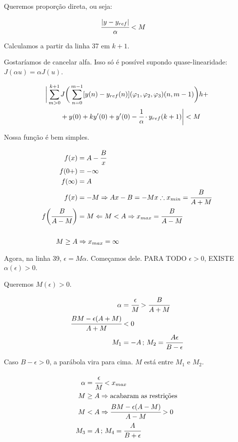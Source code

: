 \documentclass[12pt]{article}
\begin{document}
Queremos propor\c{c}\~ao direta, ou seja:

\begin{align}
  \cfrac{|y - y_{ref}|}{\alpha} &< M
\end{align}

Calculamos a partir da linha 37 em $k + 1$.

Gostar\'iamos de cancelar alfa. Isso s\'o \'e poss\'ivel supondo quase-linearidade: $J(\alpha u) = \alpha J(u)$.

\begin{align}
 \bigg|\sum_{m > 0}^{k+1} &J\bigg( \sum_{n = 0}^{m - 1} [y(n) - y_{ref}(n)] (\varphi_1, \varphi_2, \varphi_3) (n, m-1) \bigg) h + \nonumber \\
&+ y(0) + k y'(0) + y'(0) - \cfrac{1}{\alpha}\cdot y_{ref}(k + 1)\bigg| < M
\end{align}

Nossa fun\c{c}\~ao \'e bem simples.

\begin{align}
 f(x) &= A - \cfrac{B}{x} \\
 f(0+) &= - \infty \\
 f(\infty) &= A \\
 f(x) &= - M \Rightarrow Ax - B = - Mx \therefore x_{min} = \cfrac{B}{A + M} \\
 f\bigg(\cfrac{B}{A - M}\bigg) &= M \Leftarrow M < A \Rightarrow x_{max} = \cfrac{B}{A - M} \\
 \\
 M \ge A &\Rightarrow x_{max} = \infty
\end{align}

Agora, na linha 39, $\epsilon = M\alpha $. Come\c{c}amos dele. PARA TODO $\epsilon > 0$, EXISTE $\alpha(\epsilon) > 0$.

Queremos $M(\epsilon) > 0$.

\begin{align}
 \alpha &= \cfrac{\epsilon}{M} > \cfrac{B}{A + M} \\
 \cfrac{BM - \epsilon(A+M)}{A+M} &< 0 \\
 M_1 &= - A \,;\, M_2 = \cfrac{A \epsilon}{B - \epsilon}
\end{align}

Caso $B - \epsilon > 0$, a par\'abola vira para cima. $M$ est\'a entre $M_1$ e $M_2$.

\begin{align}
 \alpha &= \cfrac{\epsilon}{M} < x_{max} \\
 M &\ge A \Rightarrow \text{acabaram as restri\c{c}\~oes} \\
 M &< A \Rightarrow \cfrac{BM - \epsilon(A - M)}{A - M} > 0 \\
 M_3 &= A \,;\, M_4 = \cfrac{A}{B + \epsilon}
\end{align}
\end{document}
